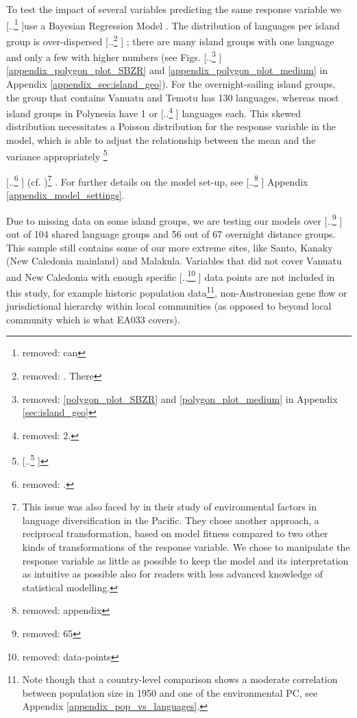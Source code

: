 \documentclass[unnumsec,webpdf,modern,medium]{oup-authoring-template}
\providecommand{\DIFaddtex}[1]{{\protect\color{blue} \sf #1}} %
\providecommand{\DIFdeltex}[1]{{\protect\color{red} [..\footnote{removed: #1} ]}} %
\providecommand{\DIFaddbegin}{} %
\providecommand{\DIFaddend}{} %
\providecommand{\DIFdelbegin}{} %
\providecommand{\DIFdelend}{} %
\providecommand{\DIFadd}[1]{\texorpdfstring{\DIFaddtex{#1}}{#1}} %
\providecommand{\DIFdel}[1]{\texorpdfstring{\DIFdeltex{#1}}{}} %
\newcommand{\DIFscaledelfig}{0.5}
\newlength{\DIFdelgraphicswidth} %
\newlength{\DIFdelgraphicsheight} %
\newcommand{\DIFaddincludegraphics}[2][]{{\color{blue}\fbox{\DIFOincludegraphics[#1]{#2}}}} %
\newcommand{\DIFdelincludegraphics}[2][]{%
\sbox{\DIFdelgraphicsbox}{\DIFOincludegraphics[#1]{#2}}%
\settoboxwidth{\DIFdelgraphicswidth}{\DIFdelgraphicsbox} %
\settoboxtotalheight{\DIFdelgraphicsheight}{\DIFdelgraphicsbox} %
\scalebox{\DIFscaledelfig}{%
\parbox[b]{\DIFdelgraphicswidth}{\usebox{\DIFdelgraphicsbox}\\[-\baselineskip] \rule{\DIFdelgraphicswidth}{0em}}\llap{\resizebox{\DIFdelgraphicswidth}{\DIFdelgraphicsheight}{%
\setlength{\unitlength}{\DIFdelgraphicswidth}%
\begin{picture}(1,1)%
\thicklines\linethickness{2pt} %
{\color[rgb]{1,0,0}\put(0,0){\framebox(1,1){}}}%
{\color[rgb]{1,0,0}\put(0,0){\line( 1,1){1}}}%
{\color[rgb]{1,0,0}\put(0,1){\line(1,-1){1}}}%
\end{picture}%
}\hspace*{3pt}}} %
} %
\DeclareRobustCommand{\DIFaddbegin}{\DIFOaddbegin \let\includegraphics\DIFaddincludegraphics} %
\DeclareRobustCommand{\DIFaddend}{\DIFOaddend \let\includegraphics\DIFOincludegraphics} %
\DeclareRobustCommand{\DIFdelbegin}{\DIFOdelbegin \let\includegraphics\DIFdelincludegraphics} %
\DeclareRobustCommand{\DIFdelend}{\DIFOaddend \let\includegraphics\DIFOincludegraphics} %
\begin{document}
\DIFaddend To test the impact of several variables predicting the same response variable we \DIFdelbegin \DIFdel{can }\DIFdelend use a Bayesian Regression Model \citep{gelman2006data, burkner2017brms}. The distribution of languages per island group is over-dispersed\DIFdelbegin \DIFdel{. There }\DIFdelend \DIFaddbegin \DIFadd{; there }\DIFaddend are many island groups with one language and only a few with higher numbers (see Figs. \DIFdelbegin \DIFdel{\ref{polygon_plot_SBZR} and \ref{polygon_plot_medium} in Appendix \ref{sec:island_geo}}\DIFdelend \DIFaddbegin \DIFadd{\ref{appendix_polygon_plot_SBZR} and \ref{appendix_polygon_plot_medium} in Appendix \ref{appendix_sec:island_geo}}\DIFaddend ). For the overnight-sailing island groups, the group that contains Vanuatu and Temotu has 130 languages, whereas most island groups in Polynesia have 1 or \DIFdelbegin \DIFdel{2. }\DIFdelend \DIFaddbegin \DIFadd{2 languages each. }\DIFaddend This skewed distribution necessitates a Poisson distribution for the response variable in the model, which is able to adjust the relationship between the mean and the variance appropriately \DIFdelbegin \footnote{\DIFdel{This issue was also faced by \citet{gavin2012island} in their study of environmental factors in language diversification in the Pacific. They chose another approach, a reciprocal transformation, based on model fitness compared to two other kinds of transformations of the response variable.}}%
\addtocounter{footnote}{-1}%
\DIFdel{. }\DIFdelend \DIFaddbegin \DIFadd{(cf. \citet{winter2021poisson})}\footnote{\DIFadd{This issue was also faced by \citet{gavin2012island} in their study of environmental factors in language diversification in the Pacific. They chose another approach, a reciprocal transformation, based on model fitness compared to two other kinds of transformations of the response variable. We chose to manipulate the response variable as little as possible to keep the model and its interpretation as intuitive as possible also for readers with less advanced knowledge of statistical modelling.}}\DIFadd{. }\DIFaddend For further details on the model set-up, see \DIFdelbegin \DIFdel{appendix }\DIFdelend \DIFaddbegin \DIFadd{Appendix }\DIFaddend \ref{appendix_model_settings}.

Due to missing data \DIFaddbegin \DIFadd{on some island groups}\DIFaddend , we are testing our models over \DIFdelbegin \DIFdel{65 }\DIFdelend \DIFaddbegin \DIFadd{64 }\DIFaddend out of 104 shared language groups and 56 out of 67 overnight distance groups. This sample still contains some of our more extreme sites, like Santo, Kanaky (New Caledonia mainland) and Malakula. Variables that did not cover Vanuatu and New Caledonia with enough specific \DIFdelbegin \DIFdel{data-points }\DIFdelend \DIFaddbegin \DIFadd{data points }\DIFaddend are not included in this study, for example historic population data\DIFaddbegin \footnote{\DIFadd{Note though that a country-level comparison shows a moderate correlation between population size in 1950 and one of the environmental PC, see Appendix \ref{appendix_pop_vs_languages}.}}\DIFaddend , non-Austronesian gene flow or jurisdictional hierarchy within local communities \DIFaddbegin \DIFadd{(as opposed to beyond local community which is what EA033 covers)}\DIFaddend . 
\end{document}

